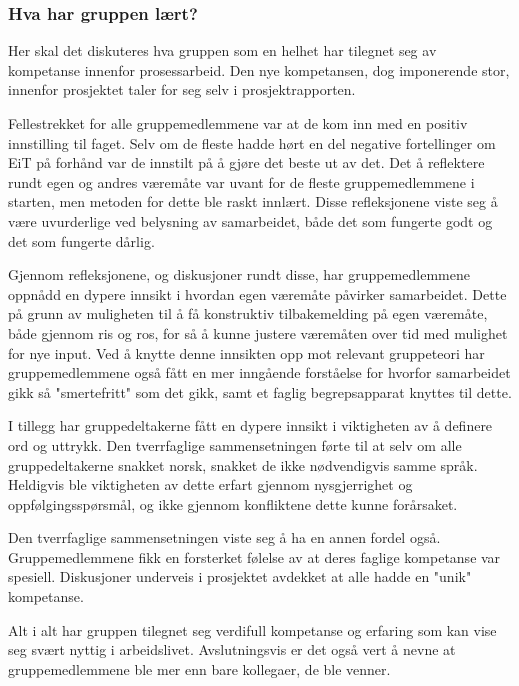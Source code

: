 \subsubsection{Hva har gruppen lært?}

Her skal det diskuteres hva gruppen som en helhet har tilegnet seg av kompetanse innenfor prosessarbeid.
Den nye kompetansen, dog imponerende stor, innenfor prosjektet taler for seg selv i prosjektrapporten.
 
Fellestrekket for alle gruppemedlemmene var at de kom inn med en positiv innstilling til faget.
Selv om de fleste hadde hørt en del negative fortellinger om EiT på forhånd var de innstilt på å gjøre det beste ut av det.
Det å reflektere rundt egen og andres væremåte var uvant for de fleste gruppemedlemmene i starten, men metoden for dette ble raskt innlært.
Disse refleksjonene viste seg å være uvurderlige ved belysning av samarbeidet, både det som fungerte godt og det som fungerte dårlig.

Gjennom refleksjonene, og diskusjoner rundt disse, har gruppemedlemmene oppnådd en dypere innsikt i hvordan egen væremåte påvirker samarbeidet.
Dette på grunn av muligheten til å få konstruktiv tilbakemelding på egen væremåte, både gjennom ris og ros, for så å kunne justere væremåten over tid med mulighet for nye input.
Ved å knytte denne innsikten opp mot relevant gruppeteori har gruppemedlemmene også fått en mer inngående forståelse for hvorfor samarbeidet gikk så "smertefritt" som det gikk, samt et faglig begrepsapparat knyttes til dette.

I tillegg har gruppedeltakerne fått en dypere innsikt i viktigheten av å definere ord og uttrykk.
Den tverrfaglige sammensetningen førte til at selv om alle gruppedeltakerne snakket norsk, snakket de ikke nødvendigvis samme språk.
Heldigvis ble viktigheten av dette erfart gjennom nysgjerrighet og oppfølgingsspørsmål, og ikke gjennom konfliktene dette kunne forårsaket.

Den tverrfaglige sammensetningen viste seg å ha en annen fordel også.
Gruppemedlemmene fikk en forsterket følelse av at deres faglige kompetanse var spesiell.
Diskusjoner underveis i prosjektet avdekket at alle hadde en "unik" kompetanse.
  
Alt i alt har gruppen tilegnet seg verdifull kompetanse og erfaring som kan vise seg svært nyttig i arbeidslivet.
Avslutningsvis er det også vert å nevne at gruppemedlemmene ble mer enn bare kollegaer, de ble venner.
